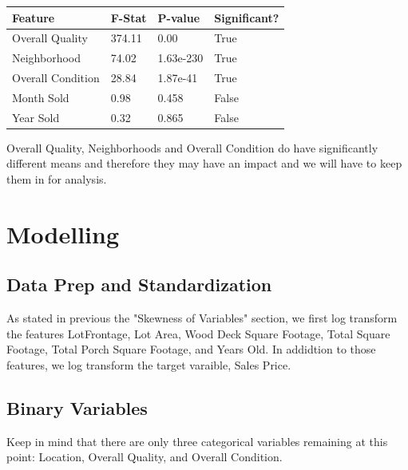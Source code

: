 \documentclass{article}
\begin{document}
	\begin{table}[]
		\centering
		\begin{tabular}{llll}
		\hline
		\multicolumn{1}{|l|}{Feature} & \multicolumn{1}{l|}{F-Stat} & \multicolumn{1}{l|}{P-value} & \multicolumn{1}{l|}{Significant?} \\ \hline
		Overall Quality               & 374.11                      & 0.00                         & True                              \\
		Neighborhood                  & 74.02                       & 1.63e-230                    & True                              \\
		Overall Condition             & 28.84                       & 1.87e-41                     & True                              \\
		Month Sold                    & 0.98                        & 0.458                        & False                             \\
		Year Sold                     & 0.32                        & 0.865                        & False                            
		\end{tabular}
		\end{table}
	

	Overall Quality, Neighborhoods and Overall Condition do have significantly different means and therefore they may have an impact and we will have to keep them in for analysis.

	\section{Modelling}

	\subsection{Data Prep and Standardization}
	
	As stated in previous the "Skewness of Variables" section, we first log transform the features LotFrontage, Lot Area, Wood Deck Square Footage, Total Square Footage, Total Porch Square Footage, and Years Old. In addidtion to those features, we log transform the target varaible, Sales Price.

	\subsection{Binary Variables}

	Keep in mind that there are only three categorical variables remaining at this point: Location, Overall Quality, and Overall Condition.
\end{document}
